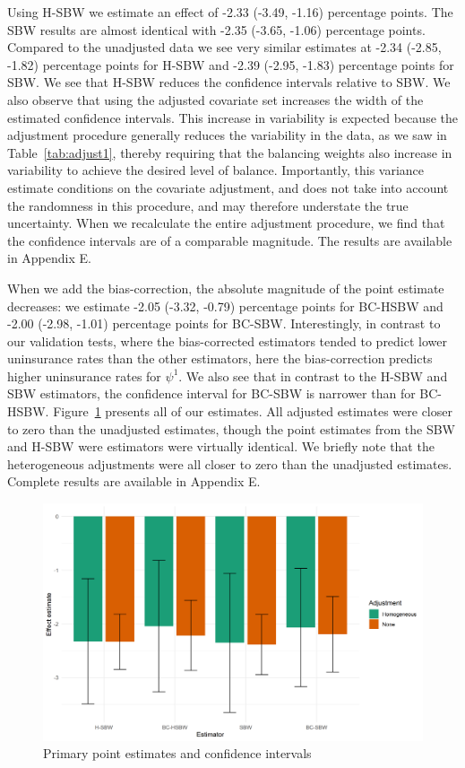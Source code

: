 \documentclass[article]{imsart}
\theoremstyle{plain}
\theoremstyle{remark}
\begin{document}
Using H-SBW we estimate an effect of -2.33 (-3.49, -1.16) percentage points. The SBW results are almost identical with -2.35 (-3.65, -1.06) percentage points. Compared to the unadjusted data we see very similar estimates at -2.34 (-2.85, -1.82) percentage points for H-SBW and -2.39 (-2.95, -1.83) percentage points for SBW. We see that H-SBW reduces the confidence intervals relative to SBW. We also observe that using the adjusted covariate set increases the width of the estimated confidence intervals. This increase in variability is expected because the adjustment procedure generally reduces the variability in the data, as we saw in Table~\ref{tab:adjust1}, thereby requiring that the balancing weights also increase in variability to achieve the desired level of balance. Importantly, this variance estimate conditions on the covariate adjustment, and does not take into account the randomness in this procedure, and may therefore understate the true uncertainty. When we recalculate the entire adjustment procedure, we find that the confidence intervals are of a comparable magnitude. The results are available in Appendix E.

When we add the bias-correction, the absolute magnitude of the point estimate decreases: we estimate -2.05 (-3.32, -0.79) percentage points for BC-HSBW and -2.00 (-2.98, -1.01) percentage points for BC-SBW. Interestingly, in contrast to our validation tests, where the bias-corrected estimators tended to predict lower uninsurance rates than the other estimators, here the bias-correction predicts higher uninsurance rates for $\psi^1$. We also see that in contrast to the H-SBW and SBW estimators, the confidence interval for BC-SBW is narrower than for BC-HSBW. Figure~\ref{fig:estimators} presents all of our estimates. All adjusted estimates were closer to zero than the unadjusted estimates, though the point estimates from the SBW and H-SBW were estimators were virtually identical. We briefly note that the heterogeneous adjustments were all closer to zero than the unadjusted estimates. Complete results are available in Appendix E.

\begin{figure}[H]
\begin{center}
    \caption{Primary point estimates and confidence intervals}
    \label{fig:estimators}
    \includegraphics[scale=0.6]{01_Plots/point-estimates-c1.png}
\end{center}
\end{figure}
\end{document}
